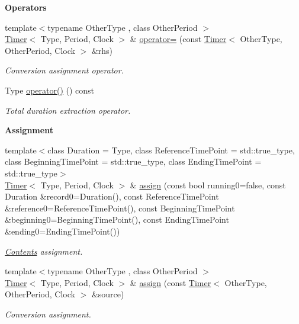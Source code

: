 \begin{Indent}{\bf Operators}\par
\begin{DoxyCompactItemize}
\item 
{\footnotesize template$<$typename Other\-Type , class Other\-Period $>$ }\\\hyperlink{exceptionmagrathea_1_1Timer}{Timer}$<$ Type, Period, Clock $>$ \& \hyperlink{exceptionmagrathea_1_1Timer_ae30b45ad6c7970c4c32489463e83729a}{operator=} (const \hyperlink{exceptionmagrathea_1_1Timer}{Timer}$<$ Other\-Type, Other\-Period, Clock $>$ \&rhs)
\begin{DoxyCompactList}\small\item\em Conversion assignment operator. \end{DoxyCompactList}\item 
Type \hyperlink{exceptionmagrathea_1_1Timer_aa31ac99d8da5b7d928ff6c451b9e1142}{operator()} () const 
\begin{DoxyCompactList}\small\item\em Total duration extraction operator. \end{DoxyCompactList}\end{DoxyCompactItemize}
\end{Indent}
\begin{Indent}{\bf Assignment}\par
\begin{DoxyCompactItemize}
\item 
{\footnotesize template$<$class Duration  = Type, class Reference\-Time\-Point  = std\-::true\-\_\-type, class Beginning\-Time\-Point  = std\-::true\-\_\-type, class Ending\-Time\-Point  = std\-::true\-\_\-type$>$ }\\\hyperlink{exceptionmagrathea_1_1Timer}{Timer}$<$ Type, Period, Clock $>$ \& \hyperlink{exceptionmagrathea_1_1Timer_a02d55fbb8de54e4ec47ffd03eb077a64}{assign} (const bool running0=false, const Duration \&record0=Duration(), const Reference\-Time\-Point \&reference0=Reference\-Time\-Point(), const Beginning\-Time\-Point \&beginning0=Beginning\-Time\-Point(), const Ending\-Time\-Point \&ending0=Ending\-Time\-Point())
\begin{DoxyCompactList}\small\item\em \hyperlink{exceptionmagrathea_1_1Contents}{Contents} assignment. \end{DoxyCompactList}\item 
{\footnotesize template$<$typename Other\-Type , class Other\-Period $>$ }\\\hyperlink{exceptionmagrathea_1_1Timer}{Timer}$<$ Type, Period, Clock $>$ \& \hyperlink{exceptionmagrathea_1_1Timer_a5a3a60dfcc1e2dc22dcbd2e9c0d49994}{assign} (const \hyperlink{exceptionmagrathea_1_1Timer}{Timer}$<$ Other\-Type, Other\-Period, Clock $>$ \&source)
\begin{DoxyCompactList}\small\item\em Conversion assignment. \end{DoxyCompactList}\end{DoxyCompactItemize}
\end{Indent}
